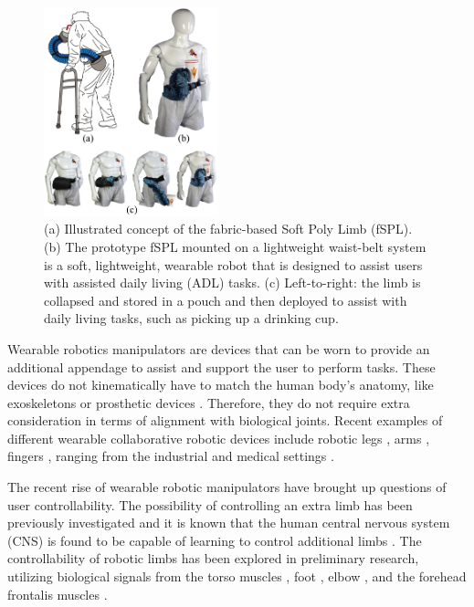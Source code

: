 \documentclass[letterpaper, 10 pt, conference]{ieeeconf}  %
\begin{document}
\begin{figure}[t!]
\centering
\includegraphics[width=0.45\textwidth]{Figures/fig1_new}
\caption{ (a) Illustrated concept of the fabric-based Soft Poly Limb (fSPL). (b) The prototype fSPL mounted on a lightweight waist-belt system is a soft, lightweight, wearable robot that is designed to assist users with assisted daily living (ADL) tasks. (c) Left-to-right: the limb is collapsed and stored in a pouch and then deployed to assist with daily living tasks, such as picking up a drinking cup.}
\label{fig:fig1}
\vspace{-1.5em}
\end{figure}

Wearable robotics manipulators are devices that can be worn to provide an additional appendage to assist and support the user to perform tasks. These devices do not kinematically have to match the human body's anatomy, like exoskeletons \cite{gopura2011} or prosthetic devices \cite{bogue2009}. Therefore, they do not require extra consideration in terms of alignment with biological joints. Recent examples of different wearable collaborative robotic devices include robotic legs \cite{kurek2017,parietti2015}, arms \cite{parietti2014,saraiji2018,vatsal2017}, fingers \cite{hussain2017b,wu2015,tiziani2017}, ranging from the industrial \cite{parietti2014} and medical settings \cite{tiziani2017}. 

The recent rise of wearable robotic manipulators have brought up questions of user controllability. The possibility of controlling an extra limb has been previously investigated and it is known that the human central nervous system (CNS) is found to be capable of learning to control additional limbs \cite{guterstam2011,tsakiris2010}. The controllability of robotic limbs has been explored in preliminary research, utilizing biological signals from the torso muscles \cite{parietti2017}, foot \cite{sasaki2017}, elbow \cite{wu2015}, and the forehead frontalis muscles \cite{salvietti2017}.
\end{document}
